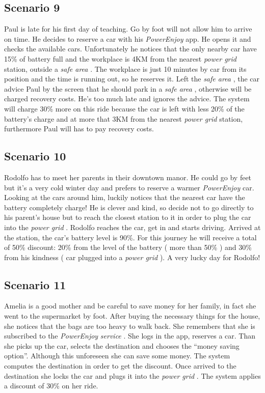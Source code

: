 \documentclass[english]{article}
\newcommand{\powerenjoy}{\textit{PowerEnjoy }}
\newcommand{\service}{\textit{service }}
\newcommand{\safearea}{\textit{safe area }}
\newcommand{\powergrid}{\textit{power grid }}
\begin{document}
	\subsection{Scenario 9}
		Paul is late for his first day of teaching. Go by foot will not allow him to arrive on time. He decides to reserve a car with his \powerenjoy app. He opens it and checks the available cars. Unfortunately he notices that the only nearby car have 15\% of battery full and the workplace is 4KM from the nearest \powergrid station, outside a \safearea. The workplace is just 10 minutes by car from its position and the time is running out, so 	he reserves it. Left the \safearea, the car advice Paul by the screen that he should 	park in a \safearea, otherwise will be charged recovery costs. He's too much late and ignores the advice. The system will charge 30\% more on this ride because the car is left with less 20\% of the battery's charge and at more that 3KM from the nearest \powergrid station, furthermore Paul will has to pay recovery costs.
	\subsection{Scenario 10}
		Rodolfo has to meet her parents in their downtown manor. He could go by feet but it's a very cold winter day and prefers to reserve a warmer \powerenjoy car. Looking at the cars around him, luckily notices that the nearest car have the battery completely charge! He is clever and kind, so decide not to go directly to his parent's house but to reach the closest station to it in order to plug the car into the \powergrid. Rodolfo reaches the car, get in and starts driving. Arrived at the station, the car's battery level is 90\%. For this journey he will receive a total of 50\% discount: 20\% from the level of the battery ( more than 50\% ) and 30\% from his kindness ( car plugged into a \powergrid ). A very lucky day for Rodolfo!
	\subsection{Scenario 11}
		Amelia is a good mother and be careful to save money for her family, in fact she went to the supermarket by foot. After buying the necessary things for the house, she notices that the bags are too heavy to walk back. She remembers that she is subscribed to the \powerenjoy \service. She logs in the app, reserves a car. Than she picks up the car, selects the destination and chooses the ``money saving option''. Although this unforeseen she can save some money. The system computes the destination in order to get the discount. Once arrived to the destination she locks the car and plugs it into the \powergrid. The system applies a discount of 30\% on her ride.
\end{document}
